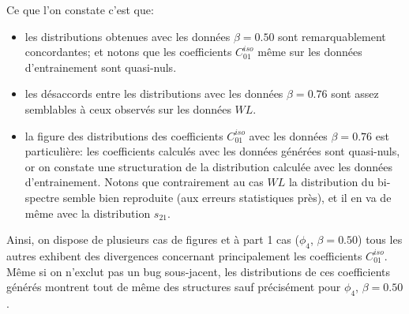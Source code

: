 \documentclass[12pt,twoside]{article}
\newcommand{\itemb}{\item[$\bullet$]}
\begin{document}
Ce que l'on constate c'est que:
\begin{itemize}
\itemb les distributions obtenues avec les données $\beta=0.50$ sont remarquablement concordantes; et notons que les coefficients $C_{01}^{iso}$ même sur les données d'entrainement sont quasi-nuls.
\itemb les désaccords entre les distributions avec les données $\beta=0.76$ sont assez semblables à ceux observés sur les données $WL$.
\itemb la figure des distributions des coefficients $C_{01}^{iso}$ avec les données $\beta=0.76$ est particulière: les coefficients calculés avec les données générées sont quasi-nuls, or on constate une structuration de la distribution calculée avec les données d'entrainement. Notons que contrairement au cas $WL$ la distribution du bi-spectre semble bien reproduite (aux erreurs statistiques près), et il en va de même avec la distribution $s_{21}$.
\end{itemize}
Ainsi, on dispose de plusieurs cas de figures et à part 1 cas ($\phi_4$, $\beta=0.50$) tous les autres exhibent des divergences concernant principalement les coefficients $C_{01}^{iso}$. Même si on n'exclut pas un bug sous-jacent, les distributions de ces coefficients générés montrent tout de même des structures sauf précisément pour $\phi_4$, $\beta=0.50$.
\end{document}
